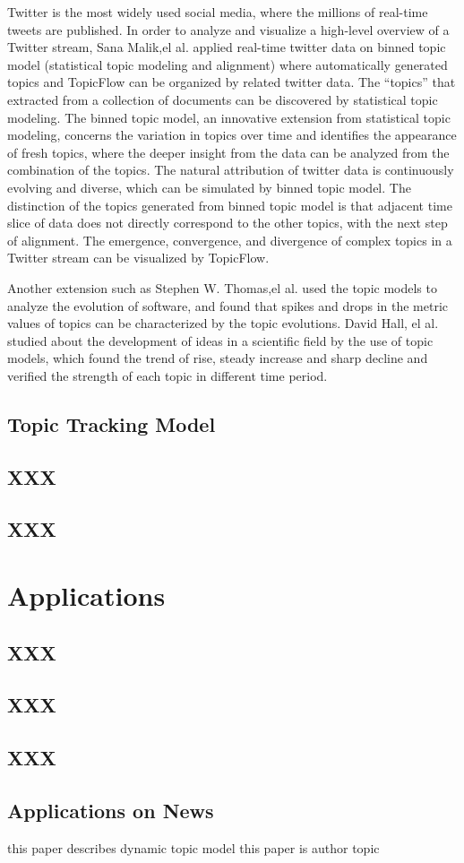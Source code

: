 Twitter is the most widely used social media, where the millions of real-time tweets are published. In order to analyze and visualize a high-level overview of a Twitter stream, Sana Malik,el al.\cite{malik2013topicflow} applied real-time twitter data on binned topic model (statistical topic modeling and alignment) where automatically generated topics and TopicFlow can be organized by related twitter data. The “topics” that extracted from a collection of documents can be discovered by statistical topic modeling. The binned topic model, an innovative extension from statistical topic modeling, concerns the variation in topics over time and identifies the appearance of fresh topics, where the deeper insight from the data can be analyzed from the combination of the topics. The natural attribution of twitter data is continuously evolving and diverse, which can be simulated by binned topic model. The distinction of the topics generated from binned topic model is that adjacent time slice of data does not directly correspond to the other topics, with the next step of alignment. The emergence, convergence, and divergence of complex topics in a Twitter stream can be visualized by TopicFlow.

Another extension such as Stephen W. Thomas,el al. \cite{thomas2010validating} used the topic models to analyze the evolution of software, and found that spikes and drops in the metric values of topics can be characterized by the topic evolutions. David Hall, el al. \cite{hall2008studying} studied about the development of ideas in a scientific field by the use of topic models, which found the trend of rise, steady increase and sharp decline and verified the strength of each topic in different time period.

\subsection{Topic Tracking Model}

\subsection{XXX}
\subsection{XXX}

\section{Applications}
\subsection{XXX}
\subsection{XXX}
\subsection{XXX}
\subsection{Applications on News}



 this paper describes dynamic topic model \cite{blei2006dynamic}
this paper is author topic \cite{rosen2004author}